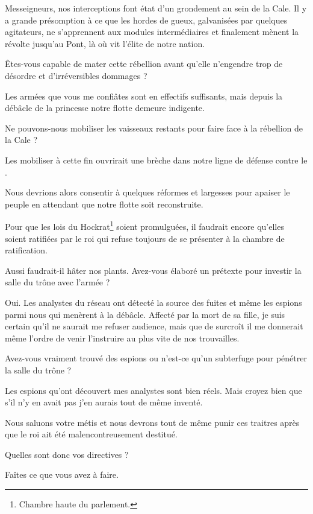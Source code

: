 \scene

\StageDirII{\general, \nobleOne, \nobleTwo, \nobleTree}


\begin{drama}
  \generalspeaks Messeigneurs, nos interceptions font état d’un grondement au sein de la Cale. Il y a grande présomption à ce que les hordes de gueux, galvanisées par quelques agitateurs, ne s’apprennent aux modules intermédiaires et finalement mènent la révolte jusqu’au Pont, là où vit l’élite de notre nation.

  \nobleOnespeaks Êtes-vous capable de mater cette rébellion avant qu’elle n’engendre trop de désordre et d’irréversibles dommages ?

  \generalspeaks Les armées que vous me confiâtes sont en effectifs suffisants, mais depuis la débâcle de la princesse \princesse{} notre flotte demeure indigente.

  \nobleTwospeaks Ne pouvons-nous mobiliser les vaisseaux restants pour faire face à la rébellion de la Cale ?

  \generalspeaks Les mobiliser à cette fin ouvrirait une brèche dans notre ligne de défense contre le \campoppose{}.

  \nobleTreespeaks Nous devrions alors consentir à quelques réformes et largesses pour apaiser le peuple en attendant que notre flotte soit reconstruite.

  \generalspeaks Pour que les lois du Hockrat\footnote{Chambre haute du parlement.} soient promulguées, il faudrait encore qu’elles soient ratifiées par le roi qui refuse toujours de se présenter à la chambre de ratification.

  \nobleOnespeaks Aussi faudrait-il hâter nos plants. Avez-vous élaboré un prétexte pour investir la salle du trône avec l’armée ?

  \generalspeaks Oui. Les analystes du réseau ont détecté la source des fuites et même les espions parmi nous qui menèrent à la débâcle. Affecté par la mort de sa fille, je suis certain qu’il ne saurait me refuser audience, mais que de surcroît il me donnerait même l’ordre de venir l’instruire au plus vite de nos trouvailles.

  \nobleTwospeaks Avez-vous vraiment trouvé des espions ou n’est-ce qu’un subterfuge pour pénétrer la salle du trône ?

  \generalspeaks Les espions qu’ont découvert mes analystes sont bien réels. Mais croyez bien que s’il n’y en avait pas j’en aurais tout de même inventé.

  \nobleTreespeaks Nous saluons votre métis et nous devrons tout de même punir ces traitres après que le roi ait été malencontreusement  destitué.

  \generalspeaks Quelles sont donc vos directives ?

   Faîtes ce que vous avez à faire.
\end{drama}

